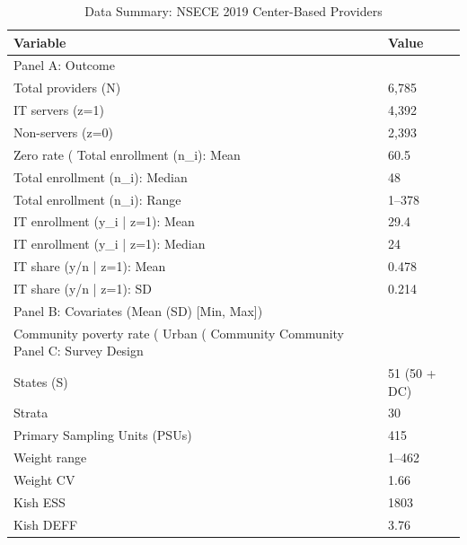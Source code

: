 \begin{table}[htbp]
\centering
\begin{tabular}{ll}
  \toprule
Variable & Value \\ 
  \midrule
Panel A: Outcome &  \\ 
  Total providers (N) & 6,785 \\ 
  IT servers (z=1) & 4,392 \\ 
  Non-servers (z=0) & 2,393 \\ 
  Zero rate (%
  Total enrollment (n_i): Mean & 60.5 \\ 
  Total enrollment (n_i): Median & 48 \\ 
  Total enrollment (n_i): Range & 1--378 \\ 
  IT enrollment (y_i | z=1): Mean & 29.4 \\ 
  IT enrollment (y_i | z=1): Median & 24 \\ 
  IT share (y/n | z=1): Mean & 0.478 \\ 
  IT share (y/n | z=1): SD & 0.214 \\ 
  Panel B: Covariates (Mean (SD) [Min, Max]) &  \\ 
  Community poverty rate (%
  Urban (%
  Community %
  Community %
  Panel C: Survey Design &  \\ 
  States (S) & 51 (50 + DC) \\ 
  Strata & 30 \\ 
  Primary Sampling Units (PSUs) & 415 \\ 
  Weight range & 1--462 \\ 
  Weight CV & 1.66 \\ 
  Kish ESS & 1803 \\ 
  Kish DEFF & 3.76 \\ 
   \bottomrule
\end{tabular}
\caption{Data Summary: NSECE 2019 Center-Based Providers} 
\end{table}
